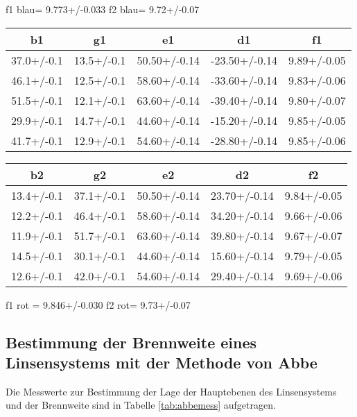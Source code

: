 f1 blau= 9.773+/-0.033
f2 blau= 9.72+/-0.07
\begin{table}
  \centering
\begin{tabular}{ccccc}
  \toprule
b1 & g1 & e1 & d1 & f1 \\
\midrule
37.0+/-0.1 & 13.5+/-0.1 & 50.50+/-0.14 & -23.50+/-0.14 & 9.89+/-0.05 \\
46.1+/-0.1 & 12.5+/-0.1 & 58.60+/-0.14 & -33.60+/-0.14 & 9.83+/-0.06 \\
51.5+/-0.1 & 12.1+/-0.1 & 63.60+/-0.14 & -39.40+/-0.14 & 9.80+/-0.07 \\
29.9+/-0.1 & 14.7+/-0.1 & 44.60+/-0.14 & -15.20+/-0.14 & 9.85+/-0.05 \\
41.7+/-0.1 & 12.9+/-0.1 & 54.60+/-0.14 & -28.80+/-0.14 & 9.85+/-0.06 \\
\bottomrule
\end{tabular}
\end{table}
\begin{table}
  \centering
\begin{tabular}{ccccc}
  \toprule
b2 & g2 & e2 & d2 & f2 \\
\midrule
13.4+/-0.1 & 37.1+/-0.1 & 50.50+/-0.14 & 23.70+/-0.14 & 9.84+/-0.05 \\
12.2+/-0.1 & 46.4+/-0.1 & 58.60+/-0.14 & 34.20+/-0.14 & 9.66+/-0.06 \\
11.9+/-0.1 & 51.7+/-0.1 & 63.60+/-0.14 & 39.80+/-0.14 & 9.67+/-0.07 \\
14.5+/-0.1 & 30.1+/-0.1 & 44.60+/-0.14 & 15.60+/-0.14 & 9.79+/-0.05 \\
12.6+/-0.1 & 42.0+/-0.1 & 54.60+/-0.14 & 29.40+/-0.14 & 9.69+/-0.06 \\
\bottomrule
\end{tabular}
\end{table}

f1 rot = 9.846+/-0.030
f2 rot= 9.73+/-0.07


\FloatBarrier
\subsection{Bestimmung der Brennweite eines Linsensystems mit der Methode von Abbe}

Die Messwerte zur Bestimmung der Lage der Hauptebenen des Linsensystems und der Brennweite sind 
in Tabelle \ref{tab:abbemess} aufgetragen.


